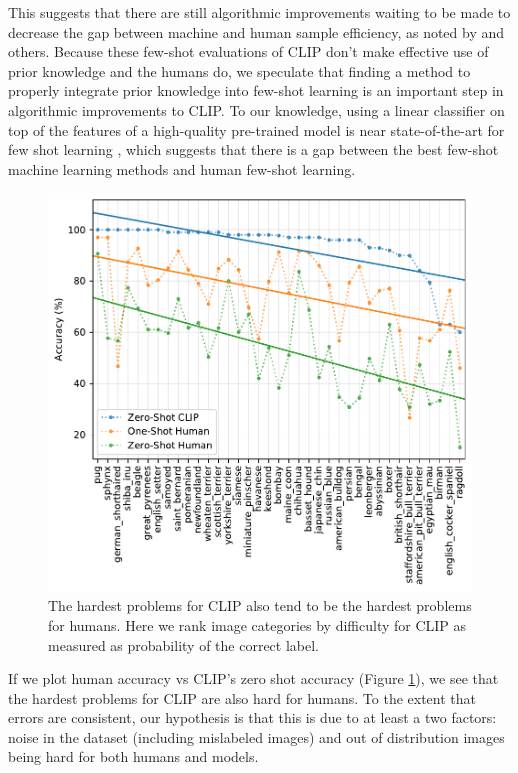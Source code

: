 \documentclass{article}
\begin{document}
This suggests that there are still algorithmic improvements waiting to be made to decrease the gap between machine and human sample efficiency, as noted by \citet{lake2016building} and others. Because these few-shot evaluations of CLIP don't make effective use of prior knowledge and the humans do, we speculate that finding a method to properly integrate prior knowledge into few-shot learning is an important step in algorithmic improvements to CLIP. To our knowledge, using a linear classifier on top of the features of a high-quality pre-trained model is near state-of-the-art for few shot learning \citep{tian2020rethinking}, which suggests that there is a gap between the best few-shot machine learning methods and human few-shot learning.

\begin{figure}[t]
\begin{center}
\centerline{\includegraphics[width=\columnwidth]{clip_human_difficulty.pdf}}
\caption{The hardest problems for CLIP also tend to be the hardest problems for humans. Here we rank image categories by difficulty for CLIP as measured as probability of the correct label.}
\label{clip_human_difficulty_fig}
\end{center}
\end{figure}

If we plot human accuracy vs CLIP’s zero shot accuracy (Figure \ref{clip_human_difficulty_fig}), we see that the hardest problems for CLIP are also hard for humans. To the extent that errors are consistent, our hypothesis is that this is due to at least a two factors: noise in the dataset (including mislabeled images) and out of distribution images being hard for both humans and models.
\end{document}
